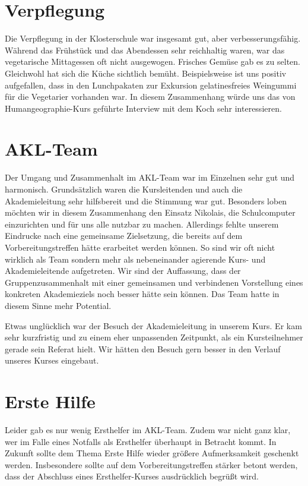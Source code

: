 \documentclass{scrartcl}
\begin{document}
\section*{Verpflegung}

Die Verpflegung in der Klosterschule war insgesamt gut, aber verbesserungsf{\"a}hig. W{\"a}hrend das Fr{\"u}hst{\"u}ck und das Abendessen sehr reichhaltig waren, war das vegetarische Mittagessen oft nicht ausgewogen. Frisches Gem{\"u}se gab es zu selten. Gleichwohl hat sich die K{\"u}che sichtlich bem{\"u}ht. Beispielsweise ist uns positiv aufgefallen, dass in den Lunchpakaten zur Exkursion gelatinesfreies Weingummi f{\"u}r die Vegetarier vorhanden war. In diesem Zusammenhang w{\"u}rde uns das von Humangeographie-Kurs gef{\"u}hrte Interview mit dem Koch sehr interessieren.

\section*{AKL-Team}

Der Umgang und Zusammenhalt im AKL-Team war im Einzelnen sehr gut und harmonisch. Grunds{\"a}tzlich waren die Kursleitenden und auch die Akademieleitung sehr hilfsbereit und die Stimmung war gut. Besonders loben m{\"o}chten wir in diesem Zusammenhang den Einsatz Nikolais, die Schulcomputer einzurichten und f{\"u}r uns alle nutzbar zu machen. Allerdings fehlte unserem Eindrucke nach eine gemeinsame Zielsetzung, die bereits auf dem Vorbereitungstreffen h{\"a}tte erarbeitet werden k{\"o}nnen. So sind wir oft nicht wirklich als Team sondern mehr als nebeneinander agierende Kurs- und Akademieleitende aufgetreten. Wir sind der Auffassung, dass der Gruppenzusammenhalt mit einer gemeinsamen und verbindenen Vorstellung eines konkreten Akademieziels noch besser h{\"a}tte sein k{\"o}nnen. Das Team hatte in diesem Sinne mehr Potential.\medskip

Etwas ungl{\"u}cklich war der Besuch der Akademieleitung in unserem Kurs. Er kam sehr kurzfristig und zu einem eher unpassenden Zeitpunkt, als ein Kursteilnehmer gerade sein Referat hielt. Wir h{\"a}tten den Besuch gern besser in den Verlauf unseres Kurses eingebaut.\bigskip

\section*{Erste Hilfe}

Leider gab es nur wenig Ersthelfer im AKL-Team. Zudem war nicht ganz klar, wer im Falle eines Notfalls als Ersthelfer {\"u}berhaupt in Betracht kommt. In Zukunft sollte dem Thema Erste Hilfe wieder gr{\"o}{\ss}ere Aufmerksamkeit geschenkt werden. Insbesondere sollte auf dem Vorbereitungstreffen st{\"a}rker betont werden, dass der Abschluss eines Ersthelfer-Kurses ausdr{\"u}cklich begr{\"u}{\ss}t wird.\bigskip
\end{document}
